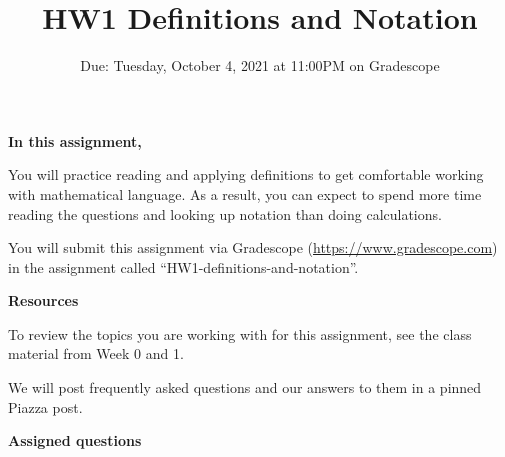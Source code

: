 

\title{HW1 Definitions and Notation}
\date{Due: Tuesday, October 4, 2021 at 11:00PM on Gradescope}


\maketitle


{\bf In this assignment,}

You will practice reading and
applying definitions to get comfortable working with mathematical language. As
a result, you can expect to spend more time reading the questions and looking
up notation than doing calculations.

\instructions

You will submit this assignment via Gradescope
(\href{https://www.gradescope.com}{https://www.gradescope.com}) 
in the assignment called ``HW1-definitions-and-notation''.


{\bf Resources}

To review the topics you are working with for this assignment, see the class material from 
Week 0 and 1.


We will post frequently asked questions and our answers to them in a 
pinned Piazza post.

{\bf Assigned questions}


